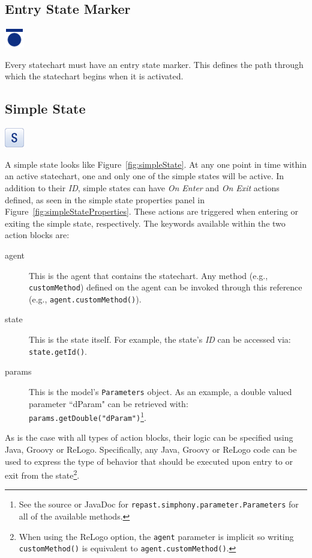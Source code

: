 \documentclass[11pt]{amsart}
\begin{document}
\subsection{Entry State Marker}
\includegraphics[height=.2in]{StatechartsImages/First-State-32.png}

Every statechart must have an entry state marker. This defines the path through which the statechart begins when it is activated.

\subsection{Simple State}
\label{sec:simpleState}
\includegraphics[height=.2in]{StatechartsImages/State-32.png}

A simple state looks like Figure~\ref{fig:simpleState}. At any one point in time within an active statechart, one and only one of the simple states will be active. In addition to their \emph{ID}, simple states can have \emph{On Enter} and \emph{On Exit} actions defined, as seen in the simple state properties panel in Figure~\ref{fig:simpleStateProperties}. These actions are triggered when entering or exiting the simple state, respectively. The keywords available within the two action blocks are:
\begin{description}
\item[agent] This is the agent that contains the statechart. Any method (e.g., \texttt{customMethod}) defined on the agent can be invoked through this reference (e.g., \texttt{agent.customMethod()}).
\item[state] This is the state itself. For example, the state's \emph{ID} can be accessed via: \texttt{state.getId()}.
\item[params] This is the model's \texttt{Parameters} object. As an example, a double valued parameter ``dParam" can be retrieved with: \texttt{params.getDouble("dParam")}\footnote{See the source or JavaDoc for  \texttt{repast.simphony.parameter.Parameters} for all of the available methods.}.
\end{description}

As is the case with all types of action blocks, their logic can be specified using Java, Groovy or ReLogo. Specifically, any Java, Groovy or ReLogo code can be used to express the type of behavior that should be executed upon entry to or exit from the state\footnote{When using the ReLogo option, the \texttt{agent} parameter is implicit so writing \texttt{customMethod()} is equivalent to \texttt{agent.customMethod()}.}.
\end{document}
